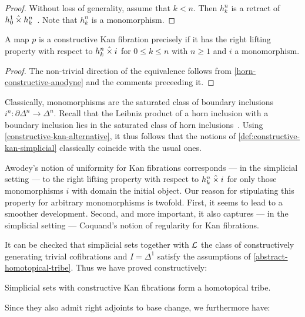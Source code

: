 \documentclass[reqno,10pt,a4paper,oneside]{amsart}
\begin{document}
\begin{proof}
Without loss of generality, assume that $k < n$.
Then $h_k^n$ is a retract of $h_0^1 \mathbin{\hat{\times}} h_k^n$~\cite[Proposition~2.1.2.6]{lurie:htt}.
Note that $h_k^n$ is a monomorphism.
\end{proof}

\begin{proposition}
\label{constructive-kan-alternative}
A map $p$ is a constructive Kan fibration precisely if it has the right lifting property with respect to $h_k^n \mathbin{\hat{\times}} i$ for $0 \leq k \leq n$ with $n \geq 1$ and $i$ a monomorphism.
\end{proposition}

\begin{proof}
The non-trivial direction of the equivalence follows from \cref{horn-constructive-anodyne} and the comments preceeding it.
\end{proof}

Classically, monomorphisms are the saturated class of boundary inclusions $i^n : \partial \Delta^n \to \Delta^n$.
Recall that the Leibniz product of a horn inclusion with a boundary inclusion lies in the saturated class of horn inclusions~\cite[Proposition~2.1.2.6]{lurie:htt}.
Using \cref{constructive-kan-alternative}, it thus follows that the notions of \cref{def:constructive-kan-simplicial} classically coincide with the usual ones.

Awodey's notion of uniformity for Kan fibrations corresponds --- in the simplicial setting --- to the right lifting property with respect to $h_k^n \mathbin{\hat{\times}} i$ for only those monomorphisms $i$ with domain the initial object.
Our reason for stipulating this property for arbitrary monomorphisms is twofold.
First, it seems to lead to a smoother development.
Second, and more important, it also captures --- in the simplicial setting --- Coquand's notion of regularity for Kan fibrations.

It can be checked that simplicial sets together with $\mathcal{L}$ the class of constructively generating trivial cofibrations and $I = \Delta^1$ satisfy the assumptions of \cref{abstract-homotopical-tribe}.
Thus we have proved constructively:

\begin{corollary}
Simplicial sets with constructive Kan fibrations form a homotopical tribe.
\end{corollary}

Since they also admit right adjoints to base change, we furthermore have:
\end{document}
